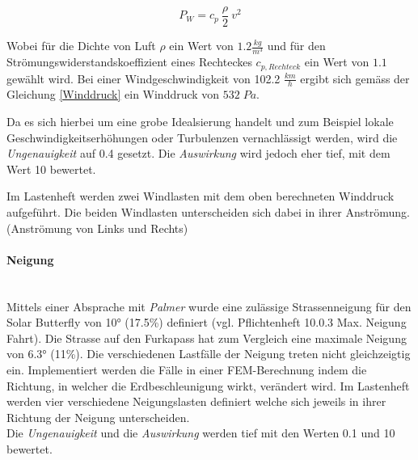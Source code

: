   \begin{equation}
    \label{Winddruck}
    P_W = c_p \: \frac{\rho}{2}\: v^2
  \end{equation}

  Wobei für die Dichte von Luft $\rho$ ein Wert von $1.2 \frac{kg}{m^3}$ und für den Strömungswiderstandskoeffizient eines Rechteckes $c_{p,Rechteck}$ ein Wert von $1.1$ gewählt wird. Bei einer Windgeschwindigkeit von 102.2 $\frac{km}{h}$ ergibt sich gemäss der Gleichung \ref{Winddruck} ein Winddruck von $532 \; Pa$.

  Da es sich hierbei um eine grobe Idealsierung handelt und zum Beispiel lokale Geschwindigkeitserhöhungen oder Turbulenzen vernachlässigt werden, wird die \emph{Ungenauigkeit} auf 0.4 gesetzt. Die \emph{Auswirkung} wird jedoch eher tief, mit dem Wert 10 bewertet.

  Im Lastenheft werden zwei Windlasten mit dem oben berechneten Winddruck aufgeführt. Die beiden Windlasten unterscheiden sich dabei in ihrer Anströmung. (Anströmung von Links und Rechts)


  \paragraph{Neigung}\mbox{}\\
  Mittels einer Absprache mit \emph{Palmer} wurde eine zulässige Strassenneigung für den Solar Butterfly von 10° (17.5\%) definiert (vgl. Pflichtenheft 10.0.3 Max. Neigung Fahrt). Die Strasse auf den Furkapass hat zum Vergleich eine maximale Neigung von 6.3° (11\%). Die verschiedenen Lastfälle der Neigung treten nicht gleichzeigtig ein. Implementiert werden die Fälle in einer FEM-Berechnung indem die Richtung, in welcher die Erdbeschleunigung wirkt, verändert wird. Im Lastenheft werden vier verschiedene Neigungslasten definiert welche sich jeweils in ihrer Richtung der Neigung unterscheiden.\\
  Die \emph{Ungenauigkeit} und die \emph{Auswirkung} werden tief mit den Werten 0.1  und 10 bewertet.



